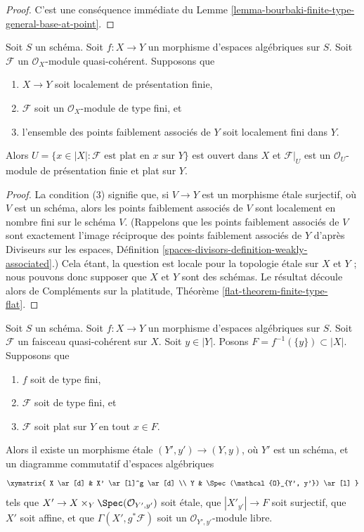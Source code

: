 \begin{proof}
C'est une conséquence immédiate du
Lemme \ref{lemma-bourbaki-finite-type-general-base-at-point}.
\end{proof}

\begin{theorem}
\label{theorem-finite-type-flat}
Soit $S$ un schéma.
Soit $f : X \to Y$ un morphisme d'espaces algébriques sur $S$.
Soit $\mathcal{F}$ un $\mathcal{O}_X$-module quasi-cohérent.
Supposons que
\begin{enumerate}
\item $X \to Y$ soit localement de présentation finie,
\item $\mathcal{F}$ soit un $\mathcal{O}_X$-module de type fini, et
\item l'ensemble des points faiblement associés de $Y$ soit localement fini dans $Y$.
\end{enumerate}
Alors $U = \{x \in |X| : \mathcal{F}\text{ est plat en }x\text{ sur }Y\}$
est ouvert dans $X$ et $\mathcal{F}|_U$ est un $\mathcal{O}_U$-module
de présentation finie et plat sur $Y$.
\end{theorem}

\begin{proof}
La condition (3) signifie que, si $V \to Y$ est un morphisme \'etale surjectif,
où $V$ est un schéma, alors les points faiblement associés de $V$
sont localement en nombre fini sur le schéma $V$. (Rappelons que les points faiblement
associés de $V$ sont exactement l'image réciproque des points faiblement associés
de $Y$ d'après Diviseurs sur les espaces, Définition
\ref{spaces-divisors-definition-weakly-associated}.)
Cela étant, la question
est locale pour la topologie \'etale sur $X$ et $Y$ ; nous pouvons donc supposer que $X$ et $Y$
sont des schémas. Le résultat découle alors de
Compléments sur la platitude, Théorème \ref{flat-theorem-finite-type-flat}.
\end{proof}

\begin{lemma}
\label{lemma-finite-type-flat-along-fibre-free-variant}
Soit $S$ un schéma. Soit $f : X \to Y$ un morphisme d'espaces algébriques
sur $S$. Soit $\mathcal{F}$ un faisceau quasi-cohérent sur $X$.
Soit $y \in |Y|$. Posons $F = f^{-1}(\{y\}) \subset |X|$. Supposons que
\begin{enumerate}
\item $f$ soit de type fini,
\item $\mathcal{F}$ soit de type fini, et
\item $\mathcal{F}$ soit plat sur $Y$ en tout $x \in F$.
\end{enumerate}
Alors il existe un morphisme \'etale $(Y', y') \to (Y, y)$,
où $Y'$ est un schéma, et un diagramme commutatif d'espaces algébriques
$$
\xymatrix{
X \ar[d] & X' \ar[l]^g \ar[d] \\
Y & \Spec(\mathcal{O}_{Y', y'}) \ar[l]
}
$$
tels que $X' \to X \times_Y \Spec(\mathcal{O}_{Y', y'})$
soit \'etale, que $|X'_{y'}| \to F$ soit surjectif, que $X'$ soit affine,
et que $\Gamma(X', g^*\mathcal{F})$ soit un $\mathcal{O}_{Y', y'}$-module libre.
\end{lemma}


